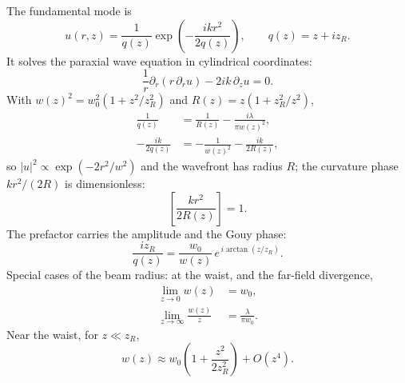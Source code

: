 
The fundamental mode is
\begin{equation}
  u(r, z) = \frac{1}{q(z)} \exp\!\left(-\frac{i k r^2}{2 q(z)}\right),
  \qquad q(z) = z + i z_R .
  \label{step:mode}
\end{equation}
It solves the paraxial wave equation in cylindrical coordinates:
\begin{equation}
  \frac{1}{r}\partial_r\!\left(r\,\partial_r u\right) - 2 i k\,\partial_z u = 0 .
  \label{step:paraxial}
\end{equation}
With $w(z)^2 = w_0^2 (1 + z^2/z_R^2)$ and $R(z) = z (1 + z_R^2/z^2)$,
\begin{align}
  \frac{1}{q(z)} &= \frac{1}{R(z)} - \frac{i \lambda}{\pi w(z)^2} , \label{step:inverse-q}\\
  -\frac{i k}{2 q(z)} &= -\frac{1}{w(z)^2} - \frac{i k}{2 R(z)} , \label{step:exponent}
\end{align}
so $|u|^2 \propto \exp(-2 r^2 / w^2)$ and the wavefront has radius $R$; the
curvature phase $k r^2 / (2R)$ is dimensionless:
\begin{equation}
  \left[\frac{k r^2}{2 R(z)}\right] = 1 . \label{step:phase-dims}
\end{equation}
The prefactor carries the amplitude and the Gouy phase:
\begin{equation}
  \frac{i z_R}{q(z)} = \frac{w_0}{w(z)}\, e^{\,i \arctan(z / z_R)} . \label{step:gouy}
\end{equation}
Special cases of the beam radius: at the waist, and the far-field divergence,
\begin{align}
  \lim_{z \to 0} w(z) &= w_0 , \label{step:waist}\\
  \lim_{z \to \infty} \frac{w(z)}{z} &= \frac{\lambda}{\pi w_0} . \label{step:divergence}
\end{align}
Near the waist, for $z \ll z_R$,
\begin{equation}
  w(z) \approx w_0 \left(1 + \frac{z^2}{2 z_R^2}\right) + O(z^4) . \label{step:near-waist}
\end{equation}
